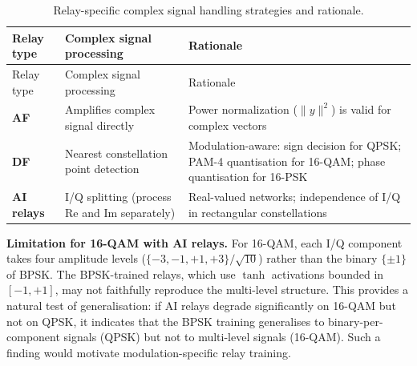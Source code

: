 \begin{longtable}[]{@{}
  >{\raggedright\arraybackslash}p{}
  >{\raggedright\arraybackslash}p{}
  >{\raggedright\arraybackslash}p{}@{}}
\caption{Relay-specific complex signal handling strategies and rationale.}\label{tbl:table31}\tabularnewline
\toprule\noalign{}
\begin{minipage}[b]{\linewidth}\raggedright
Relay type
\end{minipage} & \begin{minipage}[b]{\linewidth}\raggedright
Complex signal processing
\end{minipage} & \begin{minipage}[b]{\linewidth}\raggedright
Rationale
\end{minipage} \\
\midrule\noalign{}
\endfirsthead
\toprule\noalign{}
\begin{minipage}[b]{\linewidth}\raggedright
Relay type
\end{minipage} & \begin{minipage}[b]{\linewidth}\raggedright
Complex signal processing
\end{minipage} & \begin{minipage}[b]{\linewidth}\raggedright
Rationale
\end{minipage} \\
\midrule\noalign{}
\endhead
\bottomrule\noalign{}
\endlastfoot
\textbf{AF} & Amplifies complex signal directly & Power normalization (\(\|y\|^2\)) is valid for complex vectors \\
\textbf{DF} & Nearest constellation point detection & Modulation-aware: sign decision for QPSK; PAM-4 quantisation for 16-QAM; phase quantisation for 16-PSK \\
\textbf{AI relays} & I/Q splitting (process Re and Im separately) & Real-valued networks; independence of I/Q in rectangular constellations \\
\end{longtable}

\textbf{Limitation for 16-QAM with AI relays.} For 16-QAM, each I/Q component takes four amplitude levels (\(\{-3, -1, +1, +3\}/\sqrt{10}\)) rather than the binary \(\{\pm 1\}\) of BPSK. The BPSK-trained relays, which use \(\tanh\) activations bounded in \([-1, +1]\), may not faithfully reproduce the multi-level structure. This provides a natural test of generalisation: if AI relays degrade significantly on 16-QAM but not on QPSK, it indicates that the BPSK training generalises to binary-per-component signals (QPSK) but not to multi-level signals (16-QAM). Such a finding would motivate modulation-specific relay training.

